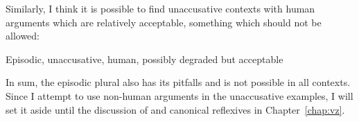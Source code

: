 \begin{exe}
\begin{xlist}
\begin{exe}
\begin{xlist}
\begin{exe}
\begin{xlist}
\begin{exe}
\begin{exe}
\begin{xlist}
\begin{exe}
\begin{xlist}
\begin{exe}
\begin{xlist}
\begin{exe}
\begin{xlist}
\begin{exe}
\begin{xlist}
\begin{exe}
\begin{xlist}
\begin{exe}
\begin{xlist}
\begin{exe}
\begin{xlist}
\begin{exe}
\begin{xlist}
\begin{exe}
\begin{xlist}
Similarly, I think it is possible to find unaccusative contexts with human arguments which are relatively acceptable, something which should not be allowed:
 \begin{exe}
 \ex  Episodic, unaccusative, human, possibly degraded but acceptable 
 \begin{xlist} 
	
	
	
	
	
 \z
\z 


In sum, the episodic plural also has its pitfalls and is not possible in all contexts. Since I attempt to use non-human arguments in the unaccusative examples, I will set it aside until the discussion of  and canonical reflexives in Chapter~\ref{chap:vz}.



\end{xlist}
\end{exe}
\end{xlist}
\end{exe}
\end{xlist}
\end{exe}
\end{xlist}
\end{exe}
\end{xlist}
\end{exe}
\end{xlist}
\end{exe}
\end{xlist}
\end{exe}
\end{xlist}
\end{exe}
\end{xlist}
\end{exe}
\end{xlist}
\end{exe}
\end{xlist}
\end{exe}
\end{exe}
\end{xlist}
\end{exe}
\end{xlist}
\end{exe}
\end{xlist}
\end{exe}
